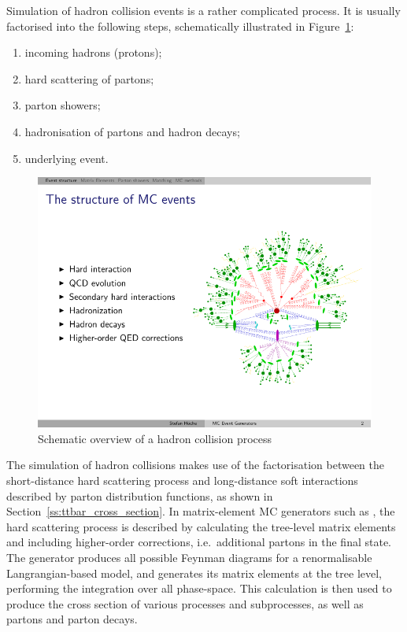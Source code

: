Simulation of hadron collision events is a rather complicated process. It is usually factorised into the following
steps, schematically illustrated in Figure~\ref{fig:MC_simulation_graphics}:

\begin{enumerate}[label=\textbullet]
  \item incoming hadrons (protons);
  \item hard scattering of partons;
  \item parton showers;
  \item hadronisation of partons and hadron decays;
  \item underlying event.
\end{enumerate}

\begin{figure}[htbp]
  \centering
  \leavevmode
  \includegraphics[width=0.7\columnwidth]{MC_simulation_graphics}
  \caption[Schematic overview of a hadron collision process]{Schematic overview of a hadron collision process
  \autocite{Hoeche_slides}}
  \label{fig:MC_simulation_graphics}
\end{figure}

The simulation of hadron collisions makes use of the factorisation between the short-distance hard scattering process
and long-distance soft interactions described by parton distribution functions, as shown in
Section~\ref{ss:ttbar_cross_section}. In matrix-element MC generators such as \MADGRAPH, the hard scattering process is
described by calculating the tree-level matrix elements and including higher-order corrections, i.e.\ additional partons
in the final state. The generator produces all possible Feynman diagrams for a renormalisable Langrangian-based model,
and generates its matrix elements at the tree level, performing the integration over all phase-space. This calculation
is then used to produce the cross section of various processes and subprocesses, as well as partons and parton decays.

